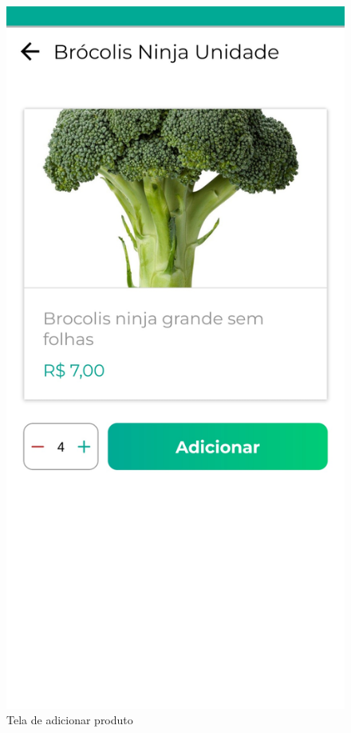 \begin{figure}[h]
	\centering
	\includegraphics[keepaspectratio=true,scale=0.16]{figuras/adicionar_produto.jpg}
	\caption{Tela de adicionar produto}
        \label{tela-adicionar-produto-app}
\end{figure}

